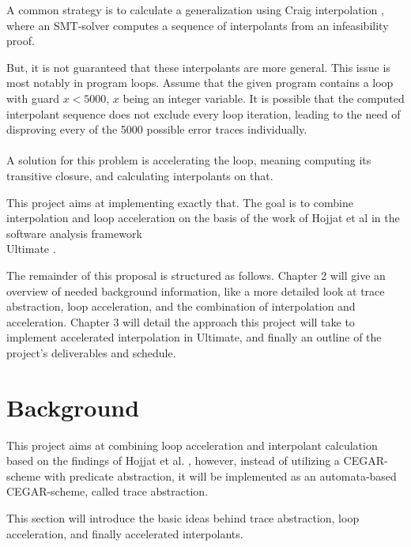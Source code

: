 \documentclass{article}
\begin{document}
A common strategy is \cite{10.1007/978-3-642-03237-0_7} to calculate a generalization using Craig interpolation \cite{craig_1957}, where an SMT-solver computes a sequence of interpolants from an infeasibility proof. \par 
But, it is not guaranteed that these interpolants are more general. This issue is most notably in program loops. Assume that the given program contains a loop with guard $x < 5000$, $x$ being an integer variable. It is possible that the computed interpolant sequence does not exclude every loop iteration, leading to the need of disproving every of the 5000 possible error traces individually. \\ \\
A solution for this problem is accelerating the loop, meaning computing its transitive closure, and calculating interpolants on that. \par This project aims at implementing exactly that. 
The goal is to combine interpolation and loop acceleration on the basis of the work of Hojjat et al \cite{10.1007/978-3-642-33386-6_16} in the software analysis framework \\ Ultimate \cite{Zitat02}. \par
The remainder of this proposal is structured as follows. Chapter 2 will give an overview of needed background information, like a more detailed look at trace abstraction, loop acceleration, and the combination of interpolation and acceleration. Chapter 3 will detail the approach this project will take to implement accelerated interpolation in Ultimate, and finally an outline of the project's deliverables and schedule.

\section{Background}
This project aims at combining loop acceleration and interpolant calculation based on the findings of Hojjat et al. \cite{10.1007/978-3-642-33386-6_16}, however, instead of utilizing a CEGAR-scheme with predicate abstraction, it will be implemented as an automata-based CEGAR-scheme, called trace abstraction. \par
This section will introduce the basic ideas behind trace abstraction, loop acceleration, and finally accelerated interpolants.
\end{document}
